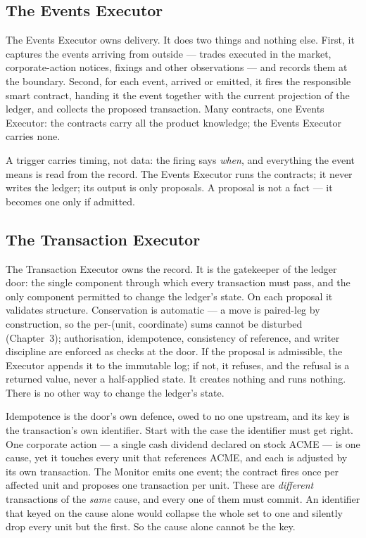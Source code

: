 \subsection{The Events Executor}

The Events Executor owns delivery. It does two things and nothing else. First,
it captures the events arriving from outside --- trades executed in the market,
corporate-action notices, fixings and other observations --- and records them
at the boundary. Second, for each event, arrived or emitted, it fires the
responsible smart contract, handing it the event together with the current
projection of the ledger, and collects the proposed transaction. Many
contracts, one Events Executor: the contracts carry all the product knowledge;
the Events Executor carries none.

A trigger carries timing, not data: the firing says \emph{when}, and everything
the event means is read from the record. The Events Executor runs the
contracts; it never writes the ledger; its output is only proposals. A proposal
is not a fact --- it becomes one only if admitted.

\subsection{The Transaction Executor}

The Transaction Executor owns the record. It is the gatekeeper of the ledger
door: the single component through which every transaction must pass, and the
only component permitted to change the ledger's state. On each proposal it
validates structure. Conservation is automatic --- a move is paired-leg by
construction, so the per-(unit, coordinate) sums cannot be disturbed
(Chapter~3); authorisation, idempotence, consistency of reference, and writer
discipline are enforced as checks at the door. If the proposal is admissible,
the Executor appends it to the immutable log; if not, it refuses, and the
refusal is a returned value, never a half-applied state. It creates nothing and
runs nothing. There is no other way to change the ledger's state.

Idempotence is the door's own defence, owed to no one upstream, and its key is the
transaction's own identifier. Start with the case the identifier must get right. One
corporate action --- a single cash dividend declared on stock ACME --- is one cause,
yet it touches every unit that references ACME, and each is adjusted by its own
transaction. The Monitor emits one event; the contract fires once per affected unit
and proposes one transaction per unit. These are \emph{different} transactions of the
\emph{same} cause, and every one of them must commit. An identifier that keyed on the
cause alone would collapse the whole set to one and silently drop every unit but the
first. So the cause alone cannot be the key.

